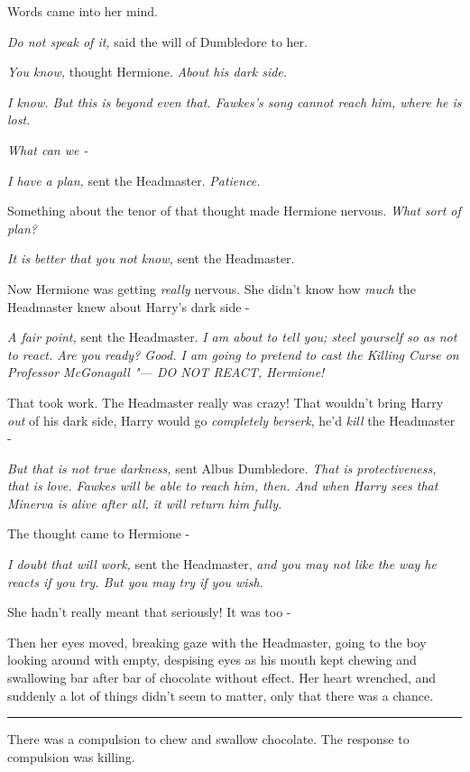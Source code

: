 Words came into her mind.

\emph{Do not speak of it,} said the will of Dumbledore to her.

\emph{You know,} thought Hermione. \emph{About his dark side.}

\emph{I know. But this is beyond even that. Fawkes's song cannot reach
him, where he is lost.}

\emph{What can we -}

\emph{I have a plan,} sent the Headmaster. \emph{Patience.}

Something about the tenor of that thought made Hermione nervous.
\emph{What sort of plan?}

\emph{It is better that you not know,} sent the Headmaster.

Now Hermione was getting \emph{really} nervous. She didn't know how
\emph{much} the Headmaster knew about Harry's dark side -

\emph{A fair point,} sent the Headmaster. \emph{I am about to tell you;
steel yourself so as not to react. Are you ready? Good. I am going to
pretend to cast the Killing Curse on Professor McGonagall "--- DO NOT
REACT, Hermione!}

That took work. The Headmaster really was crazy! That wouldn't bring
Harry \emph{out} of his dark side, Harry would go \emph{completely
berserk}, he'd \emph{kill} the Headmaster -

\emph{But that is not true darkness,} sent Albus Dumbledore. \emph{That
is protectiveness, that is love. Fawkes will be able to reach him, then.
And when Harry sees that Minerva is alive after all, it will return him
fully.}

The thought came to Hermione -

\emph{I doubt that will work,} sent the Headmaster, \emph{and you may
not like the way he reacts if you try. But you may try if you wish.}

She hadn't really meant that seriously! It was too -

Then her eyes moved, breaking gaze with the Headmaster, going to the boy
looking around with empty, despising eyes as his mouth kept chewing and
swallowing bar after bar of chocolate without effect. Her heart
wrenched, and suddenly a lot of things didn't seem to matter, only that
there was a chance.

\begin{center}\rule{3in}{0.4pt}\end{center}

There was a compulsion to chew and swallow chocolate. The response to
compulsion was killing.

